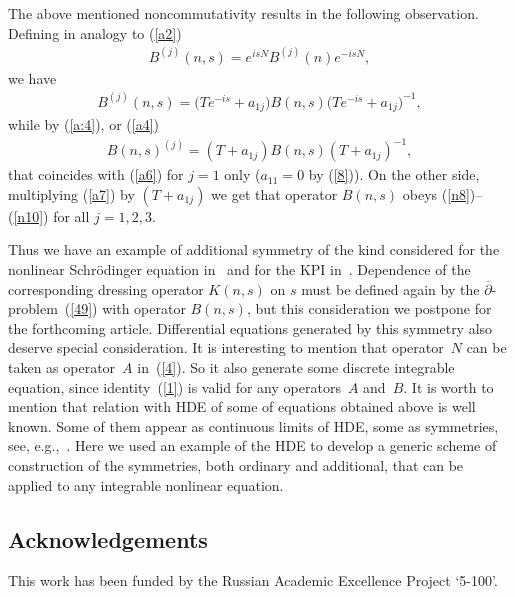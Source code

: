 \documentclass[pdftex]{sigma}
\numberwithin{equation}{section}
\begin{document}
The above mentioned noncommutativity results in the following observation. Def\/ining in analogy to (\ref{a2})
\begin{gather*}
 B^{(j)}(n,s)=e^{isN}B^{(j)}(n)e^{-isN},\label{a5}
 \end{gather*}
 we have
\begin{gather}
 B^{(j)}(n,s)=\big(Te^{-is}+a_{1j}\big)B(n,s)\big(Te^{-is}+a_{1j}\big)^{-1},\label{a6}
 \end{gather}
 while by (\ref{a:4}), or (\ref{a4})
\begin{gather}
B(n,s)^{(j)}=(T+a_{1j})B(n,s)(T+a_{1j})^{-1},\label{a7}
\end{gather}
that coincides with (\ref{a6}) for $j=1$ only ($a_{11}=0$ by (\ref{8})). On the other side, multiplying (\ref{a7}) by $(T+a_{1j})$ we get that operator $B(n,s)$ obeys (\ref{n8})--(\ref{n10}) for all $j=1,2,3$.

Thus we have an example of additional symmetry of the kind considered for the nonlinear Schr\"{o}dinger equation in~\cite{OS} and for the KPI in~\cite{Pogrebkov2000}. Dependence of the corresponding dressing operator $K(n,s)$ on $s$ must be def\/ined again by the $\overline\partial$-problem~(\ref{49}) with operator $B(n,s)$, but this consideration we postpone for the forthcoming article. Dif\/ferential equations generated by this symmetry also deserve special consideration. It is interesting to mention that opera\-tor~$N$ can be taken as operator~$A$ in~(\ref{4}). So it also generate some discrete integrable equation, since identity~(\ref{1}) is valid for any operators~$A$ and~$B$. It is worth to mention that relation with HDE of some of equations obtained above is well known. Some of them appear as continuous limits of HDE, some as symmetries, see, e.g.,~\cite{Pogrebkov2011,Zabrodin1997}. Here we used an example of the HDE to develop a generic scheme of construction of the symmetries, both ordinary and additional, that can be applied to any integrable nonlinear equation.

\subsection*{Acknowledgements}

This work has been funded by the Russian Academic Excellence Project `5-100'.
\end{document}

